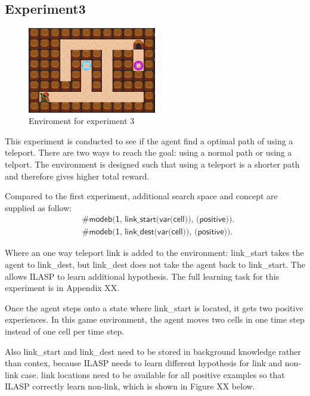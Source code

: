 \subsection{Experiment3}

\begin{figure}[!htb]
\centering
\includegraphics[width=0.5\textwidth]{./figures/experiment3_v2}
\caption{Enviroment for experiment 3}
\label{experiment3}
\end{figure}

This experiment is conducted to see if the agent find a optimal path of using a teleport.
There are two ways to reach the goal: using a normal path or using a telport. 
The environment is designed such that using a teleport is a shorter path and therefore gives higher total reward. 

Compared to the first experiment, additional search space and concept are supplied as follow:
\begin{equation*}
\begin{split}
&\textsf{\#modeb(1, link\_start(var(cell)), (positive)).}\\
&\textsf{\#modeb(1, link\_dest(var(cell)), (positive)).}
\end{split}
\end{equation*}

Where an one way teleport link is added to the environment: link\_start takes the agent to link\_dest, but link\_dest does not take the agent back to link\_start.
The allows ILASP to learn additional hypothesis.
The full learning task for this experiment is in Appendix XX.

Once the agent steps onto a state where link\_start is located, it gets two positive experiences. 
In this game environment, the agent moves two cells in one time step instead of one cell per time step.


Also link\_start and link\_dest need to be stored in background knowledge rather than contex, 
because ILASP needs to learn different hypothesis for link and non-link case. 
link locations need to be available for all positive examples so that ILASP correctly learn non-link, which is shown in Figure XX below.


